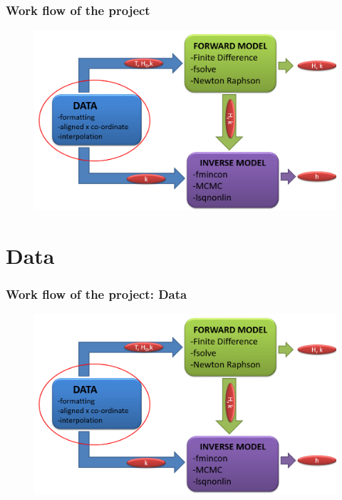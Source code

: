 \documentclass[7pt]{beamer}
\begin{document}
\begin{frame}
\frametitle{Work flow of the project }
\begin{figure}[flowchart]
\includegraphics[width=1.0\linewidth]{img/Focus_D.png}\hfill
\end{figure}

\end{frame}







\section{Data}
\begin{frame}
\frametitle{Work flow of the project: Data }
\begin{figure}[flowchart]
\includegraphics[width=1.0\linewidth]{img/Focus_D.png}\hfill
\end{figure}

\end{frame}
\end{document}
